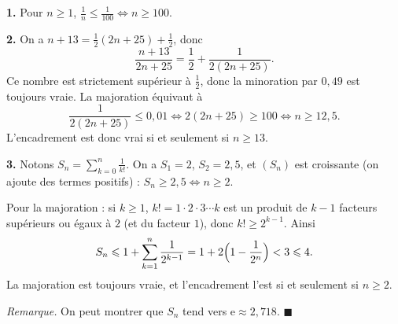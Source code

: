 \textbf{1.} Pour $n \geqslant 1$, $\frac{1}{n} \leqslant \frac{1}{100} \iff n \geqslant 100$.

\textbf{2.} On a $n + 13 = \frac12(2n + 25) + \frac12$, donc
\[
\frac{n+13}{2n+25} = \frac12 + \frac{1}{2(2n+25)}.
\]
Ce nombre est strictement supérieur à $\frac12$, donc la minoration par
$0{,}49$ est toujours vraie. La majoration équivaut à
\[
\frac{1}{2(2n+25)} \leqslant 0{,}01 \iff 2(2n+25) \geqslant 100 \iff n \geqslant 12{,}5 .
\]
L'encadrement est donc vrai si et seulement si $n \geqslant 13$.

\textbf{3.} Notons $S_n = \sum_{k=0}^{n} \frac{1}{k!}$. On a $S_1 = 2$,
$S_2 = 2{,}5$, et $(S_n)$ est croissante (on ajoute des termes positifs) :
$S_n \geqslant 2{,}5 \iff n \geqslant 2$.

Pour la majoration : si $k \geqslant 1$, $k! = 1 \cdot 2 \cdot 3 \cdots k$ est
un produit de $k - 1$ facteurs supérieurs ou égaux à $2$ (et du facteur $1$),
donc $k! \geqslant 2^{k-1}$. Ainsi
\[
S_n \leqslant 1 + \sum_{k=1}^{n} \frac{1}{2^{k-1}}
= 1 + 2\Bigl(1 - \frac{1}{2^n}\Bigr) < 3 \leqslant 4 .
\]
La majoration est toujours vraie, et l'encadrement l'est si et seulement si
$n \geqslant 2$.

\emph{Remarque.} On peut montrer que $S_n$ tend vers
$\mathrm{e} \approx 2{,}718$. \hfill $\blacksquare$
